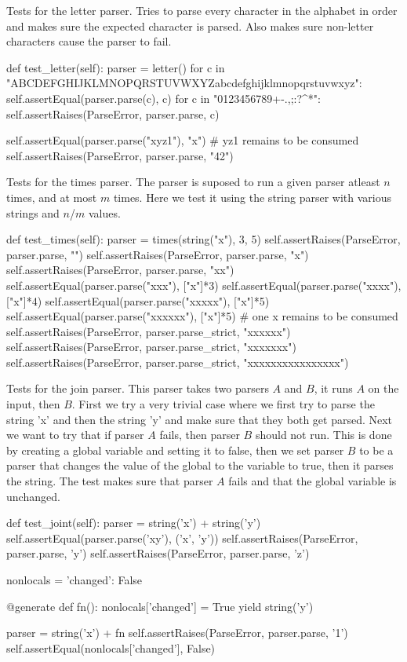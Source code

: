 
Tests for the letter parser. Tries to parse every character in the alphabet in order and makes sure the expected character is parsed.
Also makes sure non-letter characters cause the parser to fail.
\begin{python}
def test_letter(self):
    parser = letter()
    for c in "ABCDEFGHIJKLMNOPQRSTUVWXYZabcdefghijklmnopqrstuvwxyz":
        self.assertEqual(parser.parse(c), c)
    for c in "0123456789+-.,;:?^*":
        self.assertRaises(ParseError, parser.parse, c)

    self.assertEqual(parser.parse("xyz1"), "x") # yz1 remains to be consumed
    self.assertRaises(ParseError, parser.parse, "42")
\end{python}


Tests for the times parser. The parser is suposed to run a given parser atleast $n$ times, and at most $m$ times. Here we test it using the string parser with various strings and $n$/$m$ values.
\begin{python}
def test_times(self):
    parser = times(string("x"), 3, 5)
    self.assertRaises(ParseError, parser.parse, "")
    self.assertRaises(ParseError, parser.parse, "x")
    self.assertRaises(ParseError, parser.parse, "xx")
    self.assertEqual(parser.parse("xxx"), ["x"]*3)
    self.assertEqual(parser.parse("xxxx"), ["x"]*4)
    self.assertEqual(parser.parse("xxxxx"), ["x"]*5)
    self.assertEqual(parser.parse("xxxxxx"), ["x"]*5) # one x remains to be consumed
    self.assertRaises(ParseError, parser.parse_strict, "xxxxxx")
    self.assertRaises(ParseError, parser.parse_strict, "xxxxxxx")
    self.assertRaises(ParseError, parser.parse_strict, "xxxxxxxxxxxxxxxx")
\end{python}


Tests for the join parser. This parser takes two parsers $A$ and $B$, it runs $A$ on the input, then $B$. First we try a very trivial case where we first try to parse the string 'x' and then the string 'y' and make sure that they both get parsed. Next we want to try that if parser $A$ fails, then parser $B$ should not run. This is done by creating a global variable and setting it to false, then we set parser $B$ to be a parser that changes the value of the global to the variable to true, then it parses the string. The test makes sure that parser $A$ fails and that the global variable is unchanged.
\begin{python}
def test_joint(self):
    parser = string('x') + string('y')
    self.assertEqual(parser.parse('xy'), ('x', 'y'))
    self.assertRaises(ParseError, parser.parse, 'y')
    self.assertRaises(ParseError, parser.parse, 'z')

    nonlocals = {'changed': False}

    @generate
    def fn():
        nonlocals['changed'] = True
        yield string('y')

    parser = string('x') + fn
    self.assertRaises(ParseError, parser.parse, '1')
    self.assertEqual(nonlocals['changed'], False)
\end{python}



